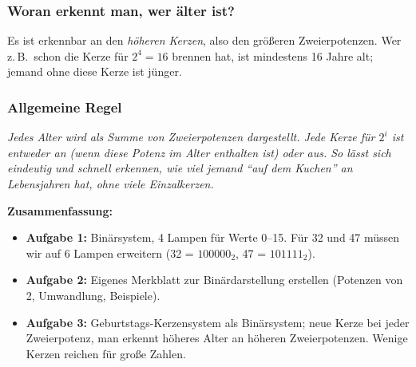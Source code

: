 \documentclass[a4paper,12pt]{article}
\begin{document}
                                                                                                   \subsubsection*{Woran erkennt man, wer älter ist?}
                                                                                                   Es ist erkennbar an den \emph{höheren Kerzen}, also den größeren Zweierpotenzen. Wer z.\,B.\ schon die Kerze für \(2^4 = 16\) brennen hat, ist mindestens 16 Jahre alt; jemand ohne diese Kerze ist jünger.

                                                                                                   \subsubsection*{Allgemeine Regel}
                                                                                                   \emph{Jedes Alter wird als Summe von Zweierpotenzen dargestellt. Jede Kerze für \(2^i\) ist entweder an (wenn diese Potenz im Alter enthalten ist) oder aus. So lässt sich eindeutig und schnell erkennen, wie viel jemand ``auf dem Kuchen'' an Lebensjahren hat, ohne viele Einzalkerzen.}

                                                                                                   \bigskip
                                                                                                   \textbf{Zusammenfassung:}
                                                                                                   \begin{itemize}
                                                                                                    \item \textbf{Aufgabe 1:} Binärsystem, 4 Lampen für Werte 0--15. Für 32 und 47 müssen wir auf 6 Lampen erweitern (32 = \(100000_2\), 47 = \(101111_2\)).
                                                                                                     \item \textbf{Aufgabe 2:} Eigenes Merkblatt zur Binärdarstellung erstellen (Potenzen von 2, Umwandlung, Beispiele).
                                                                                                      \item \textbf{Aufgabe 3:} Geburtstags-Kerzensystem als Binärsystem; neue Kerze bei jeder Zweierpotenz, man erkennt höheres Alter an höheren Zweierpotenzen. Wenige Kerzen reichen für große Zahlen.
                                                                                                      \end{itemize}

                                                                                                      
\end{document}
